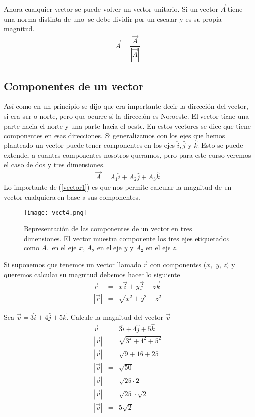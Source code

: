 Ahora cualquier vector se puede  volver un vector unitario. Si un vector $\vec{A}$ tiene una norma distinta de uno, se debe dividir por un escalar y es su propia magnitud.
\begin{eqnarray}
\vec{A}=\dfrac{\vec{A}}{|\vec{A}|}
\end{eqnarray}

\subsection{Componentes de un vector}

Así como en un principio se dijo que era importante decir la dirección del vector, si era sur o norte, pero que ocurre si la dirección es Noroeste. El vector tiene una parte hacia el norte y una parte hacia el oeste. En estos vectores se dice que tiene componentes en esas direcciones. Si generalizamos con los ejes que hemos planteado un vector puede tener componentes en los ejes $\hat{i}, \hat{j}$ y $\hat{k}$. Esto se puede extender a cuantas componentes nosotros queramos, pero para este curso veremos el caso de dos y tres dimensiones.
\begin{eqnarray}
\vec{A}=A_{1}\hat{i}+A_{2}\hat{j}+A_{3}\hat{k}
\label{vector1}
\end{eqnarray}
Lo importante de (\ref{vector1}) es que nos permite calcular la magnitud de un vector cualquiera en base a sus componentes.\\

 \begin{center}
\begin{figure}[h!]
\centering
\texttt{[image: vect4.png]}
\caption[Representación de las componentes de un vector.]{Representación de las componentes de un vector en tres dimensiones. El vector muestra componente los tres ejes etiquetados como $A_{1}$ en el eje $x$, $A_{2}$ en el eje $y$ y $A_{3}$ en el eje $z$.} \label{vect4}
\end{figure}
\end{center}


 Si suponemos que tenemos un vector llamado $\vec{r}$ con componentes $(x,$ $y$, $z)$ y queremos calcular su magnitud debemos hacer lo siguiente
\begin{eqnarray*}
\vec{r}&=&x\vec{i}+y\vec{j}+z\vec{k}\\
|\vec{r}|&=&\sqrt{x^{2}+y^{2}+z^{2}}
\end{eqnarray*} 

\begin{myexample}
Sea $\vec{v}=3\hat{i}+4\hat{j}+5\hat{k}$. Calcule la magnitud del vector $\vec{v}$
\begin{eqnarray*}
\vec{v}&=&3\hat{i}+4\hat{j}+5\hat{k}\\
|\vec{v}|&=&\sqrt{3^{2}+4^{2}+5^{2}}\\
|\vec{v}|&=&\sqrt{9+16+25}\\
|\vec{v}|&=&\sqrt{50}\\
|\vec{v}|&=&\sqrt{25\cdot 2}\\
|\vec{v}|&=&\sqrt{25}\cdot \sqrt{2}\\
|\vec{v}|&=&5\sqrt{2}\\
\end{eqnarray*}
\end{myexample}

